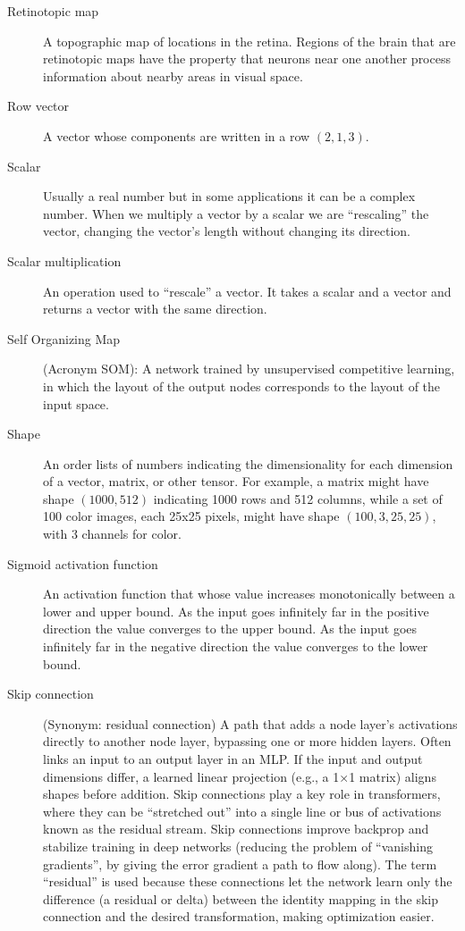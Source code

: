 \begin{description}

\item[Retinotopic map] A topographic map of locations in the retina. Regions of the brain that are retinotopic maps have the property that neurons near one another process information about nearby areas in visual space.

\item[Row vector] A vector whose components are written in a row \eg $(2,1,3)$.

\item[Scalar] Usually a real number but in some applications it can be a complex number.   When we multiply a vector by a scalar we are ``rescaling'' the vector, \ie changing the vector's length without changing its direction.

\item[Scalar multiplication] An operation used to ``rescale'' a vector. It takes a scalar and a vector and returns a vector with the same direction.

\item[Self Organizing Map] (Acronym SOM):  A network trained by unsupervised competitive learning, in which the layout of the output nodes corresponds to the layout of the input space.

\item[Shape] An order lists of numbers indicating the dimensionality for each dimension of  a vector, matrix, or other tensor. For example, a matrix might have shape $(1000, 512)$ indicating 1000 rows and 512 columns, while a set of 100 color images, each 25x25 pixels, might have shape $(100, 3, 25, 25)$, with 3 channels for color.

\item[Sigmoid activation function] An activation function that whose value increases monotonically between a lower and upper bound. As the input goes infinitely far in the positive direction the value converges to the upper bound. As the input goes infinitely far in the negative direction the value converges to the lower bound.

\item[Skip connection] (Synonym: residual connection) A path that adds a node layer’s activations directly to another node layer, bypassing one or more hidden layers. Often links an input to an output layer in an MLP.  If the input and output dimensions differ, a learned linear projection (e.g., a 1×1 matrix) aligns shapes before addition. Skip connections play a key role in transformers, where they can be ``stretched out'' into a single line or bus of activations known as the residual stream. Skip connections improve backprop and stabilize training in deep networks (reducing the problem of ``vanishing gradients'', by giving the error gradient a path to flow along). The term ``residual'' is used because these connections let the network learn only the difference (a residual or delta) between the identity mapping in the skip connection and the desired transformation, making optimization easier.


\end{description}
